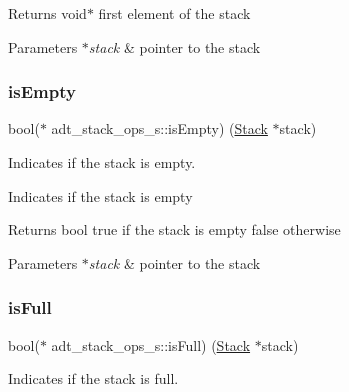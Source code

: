 \begin{DoxyReturn}{Returns}
void$\ast$ first element of the stack 
\end{DoxyReturn}

\begin{DoxyParams}{Parameters}
{\em $\ast$stack} & pointer to the stack \\
\hline
\end{DoxyParams}
\mbox{\label{structadt__stack__ops__s_ac3315785cb5d870e9cc4eb9c0b1efc79}} 
\subsubsection{\texorpdfstring{is\+Empty}{isEmpty}}
{\footnotesize\ttfamily bool($\ast$ adt\+\_\+stack\+\_\+ops\+\_\+s\+::is\+Empty) (\hyperlink{structadt__stack__s}{Stack} $\ast$stack)}



Indicates if the stack is empty. 

Indicates if the stack is empty

\begin{DoxyReturn}{Returns}
bool true if the stack is empty false otherwise 
\end{DoxyReturn}

\begin{DoxyParams}{Parameters}
{\em $\ast$stack} & pointer to the stack \\
\hline
\end{DoxyParams}
\mbox{\label{structadt__stack__ops__s_af792db2d70632a11b1ae12af63eb020b}} 
\subsubsection{\texorpdfstring{is\+Full}{isFull}}
{\footnotesize\ttfamily bool($\ast$ adt\+\_\+stack\+\_\+ops\+\_\+s\+::is\+Full) (\hyperlink{structadt__stack__s}{Stack} $\ast$stack)}



Indicates if the stack is full. 

